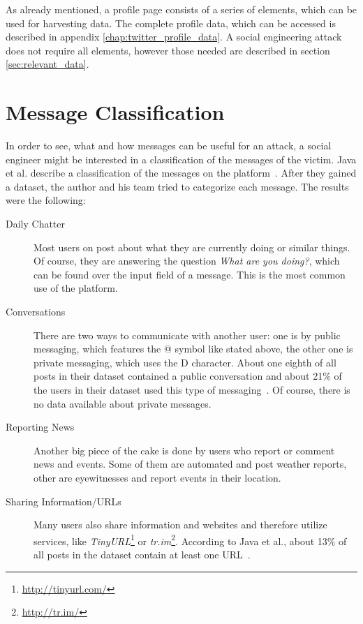 As already mentioned, a \Twitter{} profile page consists of a series of
elements, which can be used for harvesting data. The complete profile data,
which can be accessed is described in appendix \ref{chap:twitter_profile_data}.
A social engineering attack does not require all elements, however those needed
are described in section \ref{sec:relevant_data}.

\section{Message Classification}

In order to see, what and how messages can be useful for an attack, a social
engineer might be interested in a classification of the messages of the victim.
Java et al. describe a classification of the messages on the \Twitter{}
platform~\cite{java2007}. After they gained a dataset, the author and his team
tried to categorize each message. The results were the following:

\begin{description}

\item[Daily Chatter]
Most users on \Twitter{} post about what they are currently doing or similar
things. Of course, they are answering the question \textit{\glqq{}What are you
doing?\grqq{}}, which can be found over the input field of a message. This is
the most common use of the \Twitter{} platform.

\item[Conversations]
There are two ways to communicate with another user: one is by public
messaging, which features the @ symbol like stated above, the other one is
private messaging, which uses the D character. About one eighth of all posts
in their dataset contained a public conversation and about 21\% of the users in
their dataset used this type of messaging~\cite{java2007}. Of course, there is
no data available about private messages.

\item[Reporting News]
Another big piece of the cake is done by users who report or comment news and
events. Some of them are automated and post weather reports, other are
eyewitnesses and report events in their location.

\item[Sharing Information/URLs]
Many users also share information and websites and therefore utilize services,
like \textit{TinyURL}\footnote{\url{http://tinyurl.com/}} or
\textit{tr.im}\footnote{\url{http://tr.im/}}. According to Java et al.,
about 13\% of all posts in the dataset contain at least one URL~\cite{java2007}.

\end{description}


